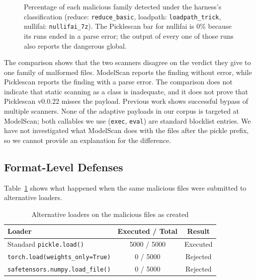 \documentclass[conference]{IEEEtran}
\begin{document}
\begin{figure}[!htbp]
\centering
{}
\caption{Percentage of each malicious family detected under the harness's classification (reduce: \texttt{reduce\_basic}, loadpath: \texttt{loadpath\_trick}, nullifai: \texttt{nullifai\_7z}). The Picklescan bar for nullifai is 0\% because its runs ended in a parse error; the output of every one of those runs also reports the dangerous global.}
\label{fig:perfamily}
\end{figure}

The comparison shows that the two scanners disagree on the verdict they give to one family of malformed files. ModelScan reports the finding without error, while Picklescan reports the finding with a parse error. The comparison does not indicate that static scanning as a class is inadequate, and it does not prove that Picklescan v0.0.22 misses the payload. Previous work shows successful bypass of multiple scanners. None of the adaptive payloads in our corpus is targeted at ModelScan; both callables we use (\texttt{exec}, \texttt{eval}) are standard blocklist entries. We have not investigated what ModelScan does with the files after the pickle prefix, so we cannot provide an explanation for the difference.

\subsection{Format-Level Defenses}
\label{sec:elimination}

Table~\ref{tab:elim} shows what happened when the same malicious files were submitted to alternative loaders.

\begin{table}[!htbp]
\centering
\caption{Alternative loaders on the malicious files as created}
\label{tab:elim}
\begin{tabular}{@{}lcc@{}}
\hline
\textbf{Loader} & \textbf{Executed / Total} & \textbf{Result} \\
\hline
Standard \texttt{pickle.load()} & 5000 / 5000 & Executed \\
\texttt{torch.load(weights\_only=True)} & 0 / 5000 & Rejected \\
\texttt{safetensors.numpy.load\_file()} & 0 / 5000 & Rejected \\
\hline
\end{tabular}
\end{table}
\end{document}
